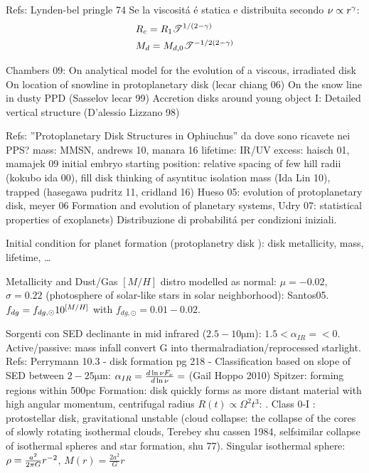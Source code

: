 \begin{workout}
Refs: Lynden-bel pringle 74
Se la viscosit\'a \'e statica e distribuita secondo $\nu\propto r^{\gamma}$:
\begin{align}
&R_c=R_1\mathcal{T}^{1/(2-\gamma)}\\
&M_d=M_{d,0}\mathcal{T}^{-1/2(2-\gamma)}\\
\end{align}
\end{workout}

\begin{workout}
Chambers 09: On analytical model for the evolution of a viscous, irradiated disk
On location of snowline in protoplanetary disk (lecar chiang 06)
On the snow line in dusty PPD (Sasselov lecar 99)
Accretion disks around young object I: Detailed vertical structure (D'alessio Lizzano 98)
\end{workout}

\begin{workout}
Refs: ''Protoplanetary Disk Structures in Ophiuchus''
da dove sono ricavete nei PPS?
mass: MMSN, andrews 10, manara 16
lifetime: IR/UV excess: haisch 01, mamajek 09
initial embryo starting position: relative spacing of few hill radii (kokubo ida 00), fill disk thinking of asyntituc isolation mass (Ida Lin 10), trapped (hasegawa pudritz 11, cridland 16)
Hueso 05: evolution of protoplanetary disk, meyer 06 Formation and evolution of planetary systems, Udry 07: statistical properties of exoplanets)
Distribuzione di probabilit\'a per condizioni iniziali.

Initial condition for planet formation (protoplanetry disk \cite{meyer2006formation}): disk metallicity, mass, lifetime, \ldots

{Metallicity and Dust/Gas}
$[M/H]$ distro modelled as normal: $\mu=-0.02$, $\sigma=0.22$ (photosphere of solar-like stars in solar neighborhood): Santos05.
$f_{dg}=f_{dg,\odot}10^{[M/H]}$ with $f_{dg,\odot}=0.01-0.02$.
\end{workout}

\begin{workout}
Sorgenti con SED declinante in mid infrared ($2.5-10\si{\micro\meter}$): $1.5<\alpha_{IR}=<0$. Active/passive: mass infall convert G into thermalradiation/reprocessed starlight.
Refs: Perrymann 10.3 - disk formation pg 218 - 
Classification based on slope of SED between $2-25\si{\micro\meter}$: $\alpha_{IR}=\frac{d \ln{\nu F_{\nu}}}{d \ln{\nu}}=$ (Gail Hoppo 2010)
Spitzer: forming regions within 500pc
Formation: disk quickly forms as more distant material with high angular momentum, centrifugal radius $R(t)\propto\Omega^2 t^3$: . Class 0-I : protostellar disk, gravitational unstable (cloud collapse: the collapse of the cores of slowly rotating isothermal clouds, Terebey shu cassen 1984, selfsimilar collapse of isothermal spheres and star formation, shu 77). Singular isothermal sphere: $\rho=\frac{a^2}{2\pi G}r^{-2}$, $M(r)=\frac{2a^2}{G}r$
\end{workout}

